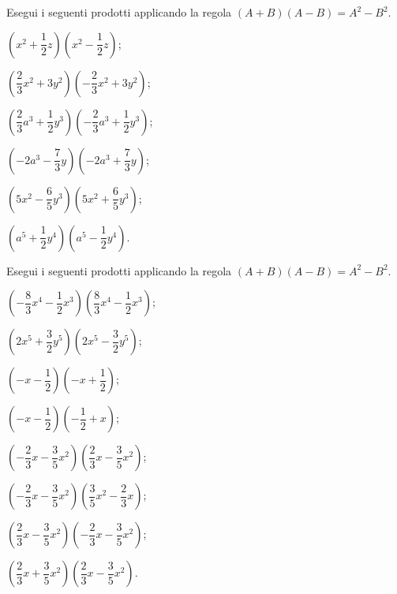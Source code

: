 \begin{esercizio}
 \label{ese:12.19}
Esegui i seguenti prodotti applicando la regola
$\left(A+B\right)\left(A-B\right)=A^{2}-B^{2}$.
 \begin{multicols}{2}
\begin{enumeratea}
 \item $\left(x^{2}+\dfrac{1}{2}z\right)\left(x^{2}-\dfrac{1}{2}z\right)$;
 \item $\left(\dfrac{2}{3}x^{2}+3y^{2}\right)\left(-{\dfrac{2}{3}}x^{2}+3y^{2}\right)$;
 \item $\left(\dfrac{2}{3}a^{3}+\dfrac{1}{2}y^{3}\right)\left(-{\dfrac{2}{3}}a^{3}+\dfrac{1}{2}y^{3}\right)$;
 \item $\left(-2a^{3}-\dfrac{7}{3}y\right)\left(-2a^{3}+\dfrac{7}{3}y\right)$;
 \item $\left(5x^{2}-\dfrac{6}{5}y^{3}\right)\left(5x^{2}+\dfrac{6}{5}y^{3}\right)$;
 \item $\left(a^{5}+\dfrac{1}{2}y^{4}\right)\left(a^{5}-\dfrac{1}{2}y^{4}\right)$.
\end{enumeratea}
\end{multicols}
\end{esercizio}

\begin{esercizio}
 \label{ese:12.20}
Esegui i seguenti prodotti applicando la regola
$\left(A+B\right)\left(A-B\right)=A^{2}-B^{2}$.
 \begin{multicols}{2}
\begin{enumeratea}
 \item $\left(-{\dfrac{8}{3}}x^{4}-\dfrac{1}{2}x^{3}\right)\left(\dfrac{8}{3}x^{4}-\dfrac{1}{2}x^{3}\right)$;
 \item $\left(2x^{5}+\dfrac{3}{2}y^{5}\right)\left(2x^{5}-\dfrac{3}{2}y^{5}\right)$;
 \item $\left(-x-\dfrac{1}{2}\right)\left(-x+\dfrac{1}{2}\right)$;
 \item $\left(-x-\dfrac{1}{2}\right)\left(-{\dfrac{1}{2}}+x\right)$;
 \item $\left(-{\dfrac{2}{3}x-\dfrac{3}{5}x^{2}}\right)\left(\dfrac{2}{3}x-\dfrac{3}{5}x^{2}\right)$;
 \item $\left(-{\dfrac{2}{3}x-\dfrac{3}{5}x^{2}}\right)\left(\dfrac{3}{5}x^{2}-\dfrac{2}{3}x\right)$;
 \item $\left(\dfrac{2}{3}x-\dfrac{3}{5}x^{2}\right)\left(-{\dfrac{2}{3}x-\dfrac{3}{5}x^{2}}\right)$;
 \item $\left(\dfrac{2}{3}x+\dfrac{3}{5}x^{2}\right)\left(\dfrac{2}{3}x-\dfrac{3}{5}x^{2}\right)$.
\end{enumeratea}
\end{multicols}
\end{esercizio}

